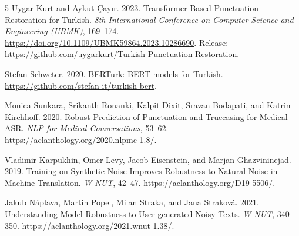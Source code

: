 \documentclass{article}
\begin{document}
\clearpage
\begin{thebibliography}{5}
Uygar Kurt and Aykut \c{C}ay\i r. 2023.
Transformer Based Punctuation Restoration for Turkish.
\emph{8th International Conference on Computer Science and Engineering (UBMK)},
169--174. \url{https://doi.org/10.1109/UBMK59864.2023.10286690}.
Release: \url{https://github.com/uygarkurt/Turkish-Punctuation-Restoration}.

Stefan Schweter. 2020. BERTurk: BERT models for Turkish.
\url{https://github.com/stefan-it/turkish-bert}.

Monica Sunkara, Srikanth Ronanki, Kalpit Dixit, Sravan Bodapati, and
Katrin Kirchhoff. 2020. Robust Prediction of Punctuation and Truecasing for
Medical ASR. \emph{NLP for Medical Conversations}, 53--62.
\url{https://aclanthology.org/2020.nlpmc-1.8/}.

Vladimir Karpukhin, Omer Levy, Jacob Eisenstein, and Marjan Ghazvininejad. 2019.
Training on Synthetic Noise Improves Robustness to Natural Noise in Machine
Translation. \emph{W-NUT}, 42--47.
\url{https://aclanthology.org/D19-5506/}.

Jakub N\'{a}plava, Martin Popel, Milan Straka, and Jana Strakov\'{a}. 2021.
Understanding Model Robustness to User-generated Noisy Texts.
\emph{W-NUT}, 340--350. \url{https://aclanthology.org/2021.wnut-1.38/}.
\end{thebibliography}
\end{document}
